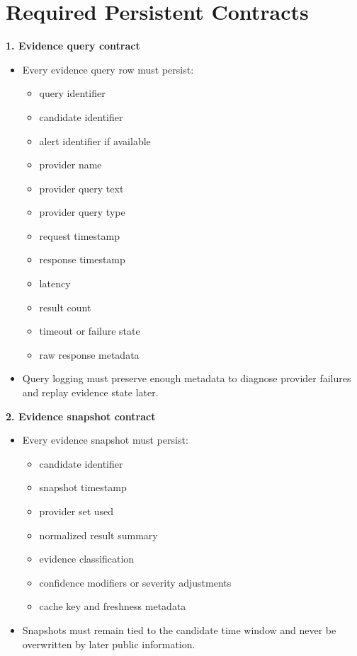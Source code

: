 \documentclass{article}
\begin{document}
\section*{Required Persistent Contracts}
\textbf{1. Evidence query contract}
\begin{itemize}
\item Every evidence query row must persist:
\begin{itemize}
\item query identifier
\item candidate identifier
\item alert identifier if available
\item provider name
\item provider query text
\item provider query type
\item request timestamp
\item response timestamp
\item latency
\item result count
\item timeout or failure state
\item raw response metadata
\end{itemize}
\item Query logging must preserve enough metadata to diagnose provider failures and replay evidence state later.
\end{itemize}

\textbf{2. Evidence snapshot contract}
\begin{itemize}
\item Every evidence snapshot must persist:
\begin{itemize}
\item candidate identifier
\item snapshot timestamp
\item provider set used
\item normalized result summary
\item evidence classification
\item confidence modifiers or severity adjustments
\item cache key and freshness metadata
\end{itemize}
\item Snapshots must remain tied to the candidate time window and never be overwritten by later public information.
\end{itemize}
\end{document}
